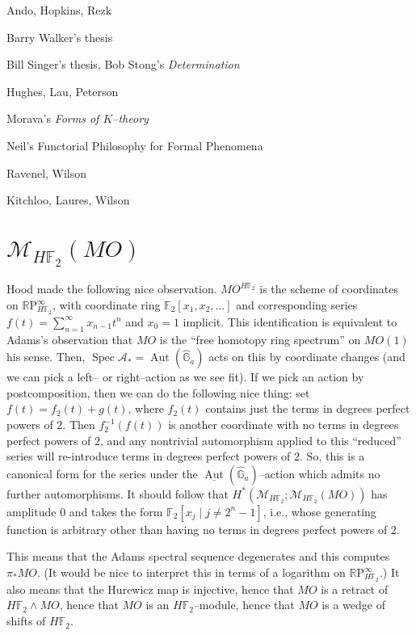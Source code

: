 \documentclass{article}
\newcommand{\F}{\mathbb F}
\newcommand{\G}{\mathbb G}
\newcommand{\R}{\mathbb R}
\newcommand{\RP}{\R\mathrm P}
\newcommand{\<}{\langle}
\renewcommand{\>}{\rangle}
\newcommand{\sm}{\wedge}
\newcommand{\context}[1]{\mathcal{M}_{#1}}
\DeclareMathOperator{\Spec}{Spec}
\begin{document}
Ando, Hopkins, Rezk

Barry Walker's thesis

Bill Singer's thesis, Bob Stong's \textit{Determination}

Hughes, Lau, Peterson

Morava's \textit{Forms of $K$--theory}

Neil's Functorial Philosophy for Formal Phenomena

Ravenel, Wilson

Kitchloo, Laures, Wilson


\section{$\context{H\F_2}(MO)$}

Hood made the following nice observation. $MO^{H\F_2}$ is the scheme of coordinates on $\RP^\infty_{H\F_2}$, with coordinate ring $\F_2[x_1, x_2, \ldots]$ and corresponding series $f(t) = \sum_{n=1}^\infty x_{n-1} t^n$ and $x_0 = 1$ implicit. This identification is equivalent to Adams's observation that $MO$ is the ``free homotopy ring spectrum'' on $MO(1)$ his sense. Then, $\Spec \mathcal{A}_* = \underline{\operatorname{Aut}}(\widehat{\G}_a)$ acts on this by coordinate changes (and we can pick a left-- or right--action as we see fit). If we pick an action by postcomposition, then we can do the following nice thing: set $f(t) = f_2(t) + g(t)$, where $f_2(t)$ contains just the terms in degrees perfect powers of $2$. Then $f_2^{-1}(f(t))$ is another coordinate with no terms in degrees perfect powers of $2$, and any nontrivial automorphism applied to this ``reduced'' series will re-introduce terms in degrees perfect powers of $2$.  So, this is a canonical form for the series under the $\underline{\operatorname{Aut}}(\widehat{\mathbb G}_a)$--action which admits no further automorphisms. It should follow that $H^*(\context{H\F_2}; \context{H\F_2}(MO))$ has amplitude $0$ and takes the form $\F_2[x_j \mid j \ne 2^n - 1]$, i.e., whose generating function is arbitrary other than having no terms in degrees perfect powers of $2$.

This means that the Adams spectral sequence degenerates and this computes $\pi_* MO$.  (It would be nice to interpret this in terms of a logarithm on $\RP^\infty_{H\F_2}$.)  It also means that the Hurewicz map is injective, hence that $MO$ is a retract of $H\F_2 \sm MO$, hence that $MO$ is an $H\F_2$--module, hence that $MO$ is a wedge of shifts of $H\F_2$.
\end{document}
